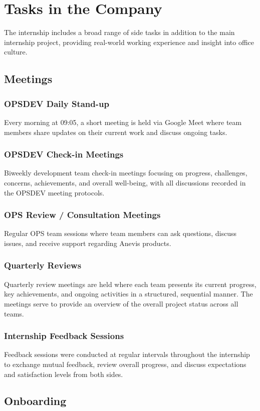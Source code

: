 \chapter{Tasks in the Company}
The internship includes a broad range of side tasks in addition to the main internship project, providing real-world working experience and insight into office culture.

\section{Meetings}

\subsection{OPSDEV Daily Stand-up}
Every morning at 09:05, a short meeting is held via Google Meet where team members share updates on their current work and discuss ongoing tasks.
\subsection{OPSDEV Check-in Meetings}
Biweekly development team check-in meetings focusing on progress, challenges, concerns, achievements, and overall well-being, with all discussions recorded in the OPSDEV meeting protocols.
\subsection{OPS Review / Consultation Meetings}
Regular OPS team sessions where team members can ask questions, discuss issues, and receive support regarding Anevis products.
\subsection{Quarterly Reviews}
Quarterly review meetings are held where each team presents its current progress, key achievements, and ongoing activities in a structured, sequential manner. The meetings serve to provide an overview of the overall project status across all teams.
\subsection{Internship Feedback Sessions}
Feedback sessions were conducted at regular intervals throughout the internship to exchange mutual feedback, review overall progress, and discuss expectations and satisfaction levels from both sides.

\section{Onboarding}

